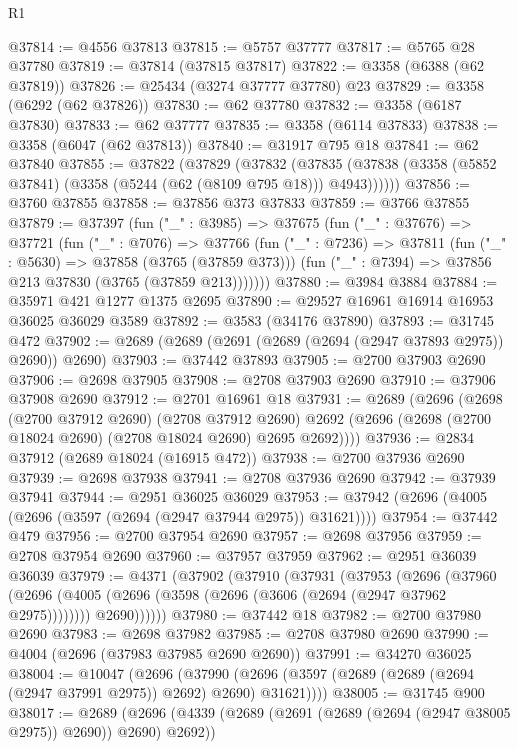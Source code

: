 \begin{lexlean}{R1}
\begin{coremodule}
@37814 := @4556 @37813
@37815 := @5757 @37777
@37817 := @5765 @28 @37780
@37819 := @37814 (@37815 @37817)
@37822 := @3358 (@6388 (@62 @37819))
@37826 := @25434 (@3274 @37777 @37780) @23
@37829 := @3358 (@6292 (@62 @37826))
@37830 := @62 @37780
@37832 := @3358 (@6187 @37830)
@37833 := @62 @37777
@37835 := @3358 (@6114 @37833)
@37838 := @3358 (@6047 (@62 @37813))
@37840 := @31917 @795 @18
@37841 := @62 @37840
@37855 := @37822
    (@37829
      (@37832
        (@37835 (@37838 (@3358 (@5852 @37841) (@3358 (@5244 (@62 (@8109 @795 @18))) @4943))))))
@37856 := @3760 @37855
@37858 := @37856 @373 @37833
@37859 := @3766 @37855
@37879 := @37397
    (fun ("_" : @3985) =>
    @37675
      (fun ("_" : @37676) =>
      @37721
        (fun ("_" : @7076) =>
        @37766
          (fun ("_" : @7236) =>
          @37811
            (fun ("_" : @5630) => @37858 (@3765 (@37859 @373)))
            (fun ("_" : @7394) => @37856 @213 @37830 (@3765 (@37859 @213)))))))
@37880 := @3984 @3884
@37884 := @35971 @421 @1277 @1375 @2695
@37890 := @29527 @16961 @16914 @16953 @36025 @36029 @3589
@37892 := @3583 (@34176 @37890)
@37893 := @31745 @472
@37902 := @2689 (@2689 (@2691 (@2689 (@2694 (@2947 @37893 @2975)) @2690)) @2690)
@37903 := @37442 @37893
@37905 := @2700 @37903 @2690
@37906 := @2698 @37905
@37908 := @2708 @37903 @2690
@37910 := @37906 @37908 @2690
@37912 := @2701 @16961 @18
@37931 := @2689
    (@2696
      (@2698
        (@2700 @37912 @2690)
        (@2708 @37912 @2690)
        @2692
        (@2696 (@2698 (@2700 @18024 @2690) (@2708 @18024 @2690) @2695 @2692))))
@37936 := @2834 @37912 (@2689 @18024 (@16915 @472))
@37938 := @2700 @37936 @2690
@37939 := @2698 @37938
@37941 := @2708 @37936 @2690
@37942 := @37939 @37941
@37944 := @2951 @36025 @36029
@37953 := @37942 (@2696 (@4005 (@2696 (@3597 (@2694 (@2947 @37944 @2975)) @31621))))
@37954 := @37442 @479
@37956 := @2700 @37954 @2690
@37957 := @2698 @37956
@37959 := @2708 @37954 @2690
@37960 := @37957 @37959
@37962 := @2951 @36039 @36039
@37979 := @4371
    (@37902
      (@37910
        (@37931
          (@37953
            (@2696
              (@37960
                (@2696 (@4005 (@2696 (@3598 (@2696 (@3606 (@2694 (@2947 @37962 @2975))))))))
                @2690))))))
@37980 := @37442 @18
@37982 := @2700 @37980 @2690
@37983 := @2698 @37982
@37985 := @2708 @37980 @2690
@37990 := @4004 (@2696 (@37983 @37985 @2690 @2690))
@37991 := @34270 @36025
@38004 := @10047
    (@2696 (@37990 (@2696 (@3597 (@2689 (@2689 (@2694 (@2947 @37991 @2975)) @2692) @2690) @31621))))
@38005 := @31745 @900
@38017 := @2689
    (@2696 (@4339 (@2689 (@2691 (@2689 (@2694 (@2947 @38005 @2975)) @2690)) @2690) @2692))

\end{coremodule}
\end{lexlean}
